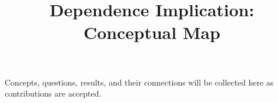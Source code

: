 \documentclass[10pt,a4paper,landscape]{article}
\title{Dependence Implication: Conceptual Map}
\author{}
\date{}
\begin{document}
\maketitle
\begin{center}
Concepts, questions, results, and their connections will be collected here
as contributions are accepted.
\end{center}

\end{document}
